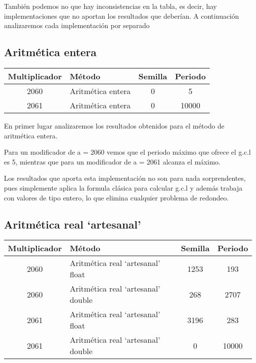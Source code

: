 También podemos no que hay inconsistencias en la tabla, es decir, hay implementaciones que no aportan los resultados que deberían. A continuación analizaremos cada implementación por separado


\subsection{Aritmética entera}
\begin{table}[H]
\centering
\begin{tabular}{|c|l|c|c|}
\hline
\textbf{Multiplicador} & \textbf{Método} & \textbf{Semilla} & \textbf{Periodo} \\ \hline
2060 & Aritmética entera & 0 & 5 \\
2061 & Aritmética entera & 0 & 10000 \\ \hline
\end{tabular}
\end{table}

En primer lugar analizaremos los resultados obtenidos para el método de aritmética entera.

Para un modificador de a = 2060 vemos que el periodo máximo que ofrece el g.c.l es 5, mientras que para un modificador de a = 2061 alcanza el máximo.

Los resultados que aporta esta implementación no son para nada sorprendentes, pues simplemente aplica la formula clásica para calcular g.c.l y además trabaja con valores de tipo entero, lo que elimina cualquier problema de redondeo.

\subsection{Aritmética real `artesanal'}
\begin{table}[H]
\centering
\begin{tabular}{|c|l|c|c|}
\hline
\textbf{Multiplicador} & \textbf{Método} & \textbf{Semilla} & \textbf{Periodo} \\ \hline
2060 & Aritmética real `artesanal' float & 1253 & 193 \\
2060 & Aritmética real `artesanal' double & 268 & 2707 \\
2061 & Aritmética real `artesanal' float & 3196 & 283 \\
2061 & Aritmética real `artesanal' double & 0 & 10000 \\ \hline
\end{tabular}
\end{table}

